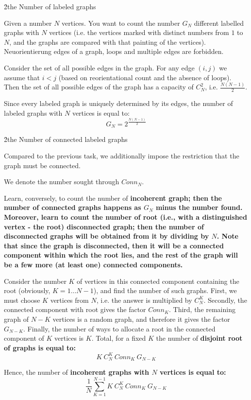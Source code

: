 \h2{the Number of labeled graphs}

Given a number $N$ vertices. You want to count the number $G_N$ different labelled graphs with $N$ vertices (i.e. the vertices marked with distinct numbers from $1$ to $N$, and the graphs are compared with that painting of the vertices). Neuorientierung edges of a graph, loops and multiple edges are forbidden.

Consider the set of all possible edges in the graph. For any edge $(i,j)$ we assume that $i<j$ (based on reorientational count and the absence of loops). Then the set of all possible edges of the graph has a capacity of $C_N^2$, i.e. $\frac{ N (N-1) }{ 2 }$.

Since every labeled graph is uniquely determined by its edges, the number of labeled graphs with $N$ vertices is equal to:
$$ G_N = 2^{ \frac{ N (N-1) }{ 2 } } $$

\h2{the Number of connected labeled graphs}

Compared to the previous task, we additionally impose the restriction that the graph must be connected.

We denote the number sought through $Conn_N$.

Learn, conversely, to count the number of \bf{incoherent} graph; then the number of connected graphs happens as $G_N$ minus the number found. Moreover, learn to count the number of \bf{root} (i.e., with a distinguished vertex - the root) \bf{disconnected graph}; then the number of disconnected graphs will be obtained from it by dividing by $N$. Note that since the graph is disconnected, then it will be a connected component within which the root lies, and the rest of the graph will be a few more (at least one) connected components.

Consider the number $K$ of vertices in this connected component containing the root (obviously, $K = 1 \ldots N-1$), and find the number of such graphs. First, we must choose $K$ vertices from $N$, i.e. the answer is multiplied by $C_N^K$. Secondly, the connected component with root gives the factor $Conn_K$. Third, the remaining graph of $N-K$ vertices is a random graph, and therefore it gives the factor $G_{N-K}$. Finally, the number of ways to allocate a root in the connected component of $K$ vertices is $K$. Total, for a fixed $K$ the number of \bf{disjoint root} of graphs is equal to:
$$ K\ C_N^K\ Conn_K\ G_{N-K} $$

Hence, the number of \bf{incoherent} graphs with $N$ vertices is equal to:
$$ \frac{1}{N} \sum_{K=1}^{N-1} K\ C_N^K\ Conn_K\ G_{N-K} $$

